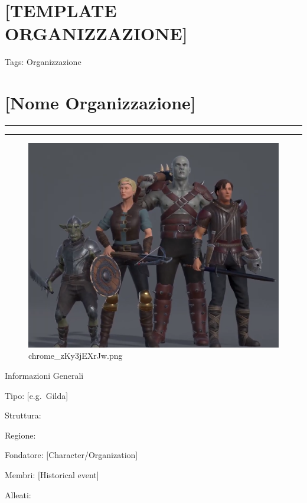\section{{[}TEMPLATE ORGANIZZAZIONE{]}}\label{template-organizzazione}

Tags: Organizzazione

\section{{[}Nome Organizzazione{]}}\label{nome-organizzazione}

\begin{center}\rule{0.5\linewidth}{0.5pt}\end{center}

\begin{center}\rule{0.5\linewidth}{0.5pt}\end{center}

\begin{figure}
\centering
\includegraphics{chrome_zKy3jEXrJw.png}
\caption{chrome\_zKy3jEXrJw.png}
\end{figure}

Informazioni Generali

Tipo: {[}e.g.~Gilda{]}

Struttura:

Regione:

Fondatore: {[}Character/Organization{]}

Membri: {[}Historical event{]}

Alleati:

